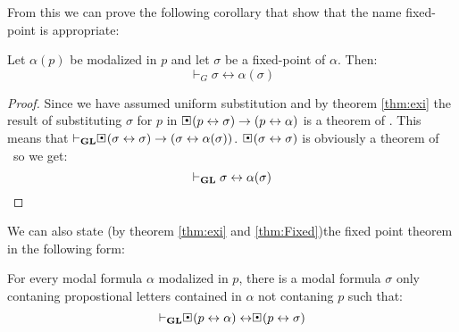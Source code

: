 \documentclass[../main.tex]{subfiles}
\begin{document}
From this we can prove the following corollary that show that the name
fixed-point is appropriate:
\begin{cor}
	Let $\alpha(p)$ be modalized in $p$ and let $\sigma$ be a fixed-point
	of $\alpha$. Then:
	\[\vdash_G\sigma\leftrightarrow\alpha(\sigma)\]
\end{cor}
\begin{proof}
	Since we have assumed uniform substitution and by theorem \ref{thm:exi}
	the result of substituting $\sigma$ for $p$ in
	$\sBox(p\leftrightarrow\sigma)\rightarrow(p\leftrightarrow\alpha)$ is a
	theorem of \GL. This means that
	$\vdash_\GL\sBox(\sigma\leftrightarrow\sigma)\rightarrow(\sigma\leftrightarrow\alpha(\sigma))$.
	$\sBox(\sigma\leftrightarrow\sigma)$ is obviously a theorem of \GL\ so
	we get:
	\[\vdash_{\text{\textbf{GL}}}\sigma\leftrightarrow\alpha(\sigma)\]
\end{proof}
We can also state  (by theorem \ref{thm:exi} and \ref{thm:Fixed})the fixed
point theorem in the following form:

\begin{cor}
	\label{cor:Fixed}
	For every modal formula $\alpha$ modalized in $p$, there is a modal formula
	$\sigma$ only contaning propostional letters contained in $\alpha$ not
	contaning $p$ such that:
	\[\vdash_\GL\sBox(p\leftrightarrow\alpha)\leftrightarrow\sBox(p\leftrightarrow\sigma)\]
\end{cor}
\end{document}
